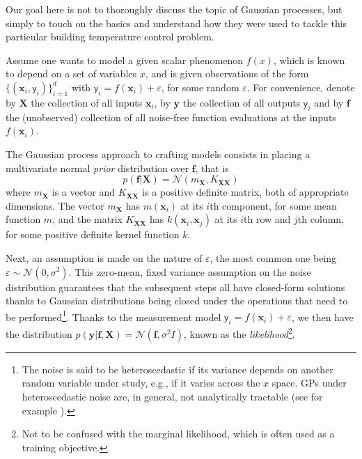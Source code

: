 
Our goal here is not to thoroughly discuss the topic of Gaussian processes, but simply to touch on the basics and understand how they were used to tackle this particular building temperature control problem.

Assume one wants to model a given scalar phenomenon $f(x)$, which is known to depend on a set of variables $x$, and is given observations of the form $\{(\mathbf{x}_i,\mathsf{y}_i)\}_{i=1}^d$ with $\mathsf{y}_i = f(\mathbf{x}_i) + \varepsilon$, for some random $\varepsilon$. For convenience, denote by $\mathbf{X}$ the collection of all inputs $\mathbf{x}_i$, by $\mathbf{y}$ the collection of all outputs $\mathsf{y}_i$ and by $\mathbf{f}$ the (unobserved) collection of all noise-free function evaluations at the inputs $f(\mathbf{x}_i)$.

The Gaussian process approach to crafting models consists in placing a multivariate normal \textit{prior} distribution over $\mathbf{f}$, that is
\begin{equation}
	\label{eq.prior}
	p(\mathbf{f} | \mathbf{X}) = \mathcal{N}(m_\mathbf{X}, K_{\mathbf{X}\mathbf{X}})
\end{equation}
where $m_\mathbf{X}$ is a vector and $K_{\mathbf{X}\mathbf{X}}$ is a positive definite matrix, both of appropriate dimensions. The vector $m_\mathbf{X}$ has $m(\mathbf{x}_i)$ at its $i$th component, for some mean function $m$, and the matrix $K_{\mathbf{X}\mathbf{X}}$ has $k(\mathbf{x}_i, \mathbf{x}_j)$ at its $i$th row and $j$th column, for some positive definite kernel function $k$.

Next, an assumption is made on the nature of $\varepsilon$, the most common one being $\varepsilon \sim \mathcal{N}(0,\sigma^2)$. This zero-mean, fixed variance assumption on the noise distribution guarantees that the subsequent steps all have closed-form solutions thanks to Gaussian distributions being closed under the operations that need to be performed\footnote{The noise is said to be heteroscedastic if its variance depends on another random variable under study, e.g., if it varies across the $x$ space. GPs under heteroscedastic noise are, in general, not analytically tractable (see for example \cite{goldberg1997regression,binois2018practical}).}. Thanks to the measurement model $\mathsf{y}_i = f(\mathbf{x}_i) + \varepsilon$, we then have the distribution $p(\mathbf{y}|\mathbf{f},\mathbf{X}) = \mathcal{N}(\mathbf{f}, \sigma^2 I )$, known as the \textit{likelihood}\footnote{Not to be confused with the marginal likelihood, which is often used as a training objective.}.

